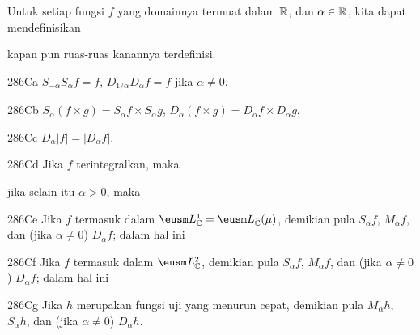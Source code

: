  Untuk setiap fungsi $f$ yang domainnya termuat dalam $\Bbb R$,
dan $\alpha\in\Bbb R$, kita dapat mendefinisikan


\noindent kapan pun ruas-ruas kanannya terdefinisi. 

\spheader 286Ca $S_{-\alpha}S_{\alpha}f=f$, $D_{1/\alpha}D_{\alpha}f=f$ jika
$\alpha\ne 0$.

\spheader 286Cb $S_{\alpha}(f\times g)=S_{\alpha}f\times S_{\alpha}g$,
$D_{\alpha}(f\times g)=D_{\alpha}f\times D_{\alpha}g$.

\spheader 286Cc $D_{\alpha}|f|=|D_{\alpha}f|$.

\spheader 286Cd Jika $f$ terintegralkan, maka


\noindent jika selain itu $\alpha>0$, maka



\spheader 286Ce Jika $f$ termasuk dalam
$\eusm L^1_{\Bbb C}=\eusm L^1_{\Bbb C}(\mu)$, demikian pula
$S_{\alpha}f$, $M_{\alpha}f$, dan (jika $\alpha\ne 0$) $D_{\alpha}f$;
dalam hal ini


\spheader 286Cf Jika $f$ termasuk dalam $\eusm L^2_{\Bbb C}$, demikian pula
$S_{\alpha}f$, $M_{\alpha}f$, dan (jika $\alpha\ne 0$) $D_{\alpha}f$;
dalam hal ini


\spheader 286Cg Jika $h$ merupakan fungsi uji yang menurun cepat, demikian pula $M_{\alpha}h$, $S_{\alpha}h$, dan
(jika $\alpha\ne 0$) $D_{\alpha}h$.

